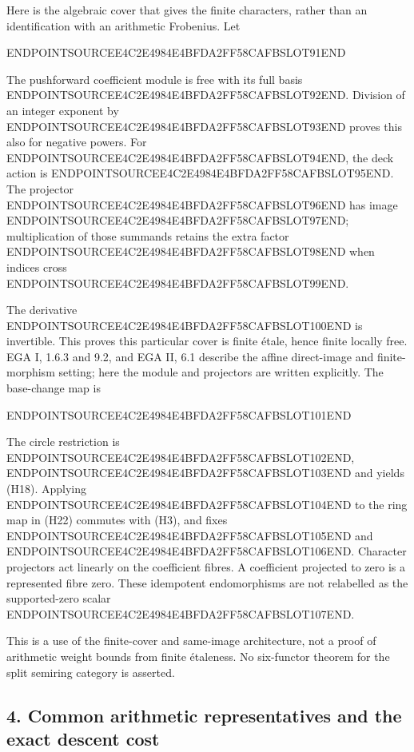 Here is the algebraic cover that gives the finite characters, rather than an identification with an arithmetic Frobenius. Let

ENDPOINTSOURCEE4C2E4984E4BFDA2FF58CAFBSLOT91END

The pushforward coefficient module is free with its full basis ENDPOINTSOURCEE4C2E4984E4BFDA2FF58CAFBSLOT92END. Division of an integer exponent by ENDPOINTSOURCEE4C2E4984E4BFDA2FF58CAFBSLOT93END proves this also for negative powers. For ENDPOINTSOURCEE4C2E4984E4BFDA2FF58CAFBSLOT94END, the deck action is ENDPOINTSOURCEE4C2E4984E4BFDA2FF58CAFBSLOT95END. The projector ENDPOINTSOURCEE4C2E4984E4BFDA2FF58CAFBSLOT96END has image ENDPOINTSOURCEE4C2E4984E4BFDA2FF58CAFBSLOT97END; multiplication of those summands retains the extra factor ENDPOINTSOURCEE4C2E4984E4BFDA2FF58CAFBSLOT98END when indices cross ENDPOINTSOURCEE4C2E4984E4BFDA2FF58CAFBSLOT99END.

The derivative ENDPOINTSOURCEE4C2E4984E4BFDA2FF58CAFBSLOT100END is invertible. This proves this particular cover is finite étale, hence finite locally free. EGA I, 1.6.3 and 9.2, and EGA II, 6.1 describe the affine direct-image and finite-morphism setting; here the module and projectors are written explicitly. The base-change map is

ENDPOINTSOURCEE4C2E4984E4BFDA2FF58CAFBSLOT101END

The circle restriction is ENDPOINTSOURCEE4C2E4984E4BFDA2FF58CAFBSLOT102END, ENDPOINTSOURCEE4C2E4984E4BFDA2FF58CAFBSLOT103END and yields (H18). Applying ENDPOINTSOURCEE4C2E4984E4BFDA2FF58CAFBSLOT104END to the ring map in (H22) commutes with (H3), and fixes ENDPOINTSOURCEE4C2E4984E4BFDA2FF58CAFBSLOT105END and ENDPOINTSOURCEE4C2E4984E4BFDA2FF58CAFBSLOT106END. Character projectors act linearly on the coefficient fibres. A coefficient projected to zero is a represented fibre zero. These idempotent endomorphisms are not relabelled as the supported-zero scalar ENDPOINTSOURCEE4C2E4984E4BFDA2FF58CAFBSLOT107END.

This is a use of the finite-cover and same-image architecture, not a proof of arithmetic weight bounds from finite étaleness. No six-functor theorem for the split semiring category is asserted.

\subsection{4. Common arithmetic representatives and the exact descent cost}\label{endpoint-holonomy_original--common-arithmetic-representatives-and-the-exact-descent-cost}

